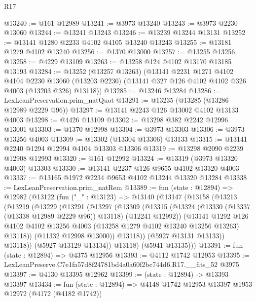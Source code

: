 \begin{lexlean}{R17}
\begin{coremodule}
@13240 := @161 @12989
@13241 := @3973 @13240
@13243 := @3973 @2230 @13060
@13244 := @13241 @13243
@13246 := @13239 @13244 @13131
@13252 := @13141 @1280 @2233 @4102 @4105 @13240 @13243
@13255 := @13181 @1279 @4102 @13240
@13256 := @1370 @13000
@13257 := @13255 @13256
@13258 := @4229 @13109
@13263 := @13258 @124 @4102 @13170 @13185 @13193
@13284 := @13252
    (@13257 @13263)
    (@13141
      @2231
      @1271
      @4102
      @4104
      @2230
      @13060
      (@13203 @2230)
      (@13141 @327 @126 @4102 @4102 @326 @4003 (@13203 @326) @13118))
@13285 := @13246 @13284
@13286 := LexLeanPreservation.prim_natQuot
@13291 := @13235 (@13285 (@13286 @12989 @2229 @96))
@13297 := @13141 @2243 @126 @13002 @4102 @13133 @4003
@13298 := @4426 @13109
@13302 := @13298 @382 @2242 @12996 @13001
@13303 := @1370 @12998
@13304 := @3973 @13303
@13306 := @3973 @13256 @4003
@13309 := @13302 (@13304 @13306) @13133
@13315 := @13141 @2240 @1294 @12994 @4104 @13303 @13306
@13319 := @13298 @2090 @2239 @12908 @12993
@13320 := @161 @12992
@13324 := @13319 (@3973 @13320 @4003) @13303
@13330 := @13141 @2237 @126 @9655 @4102 @13320 @4003
@13337 := @13165 @1972 @2234 @9653 @4102 @13244 @13320 @13284
@13338 := LexLeanPreservation.prim_natRem
@13389 := fun (state : @12894) =>
  @12982
    (@13122
      (fun ("_" : @13123) =>
      @13140
        (@13147
          (@13158
            (@13213
              (@13219
                (@13229
                  (@13291
                    (@13297
                      (@13309
                        (@13315
                          (@13324
                            (@13330 (@13337 (@13338 @12989 @2229 @96)) @13118)
                            (@12241 @12992))
                          (@13141
                            @1292
                            @126
                            @4102
                            @4102
                            @13256
                            @4003
                            (@13258 @1279 @4102 @13240 @13256 @13263)
                            @13118))
                        (@11332 @12998 @13000))
                      @13118))
                  (@5927 @13131 @13133))
                @13118))
            (@5927 @13129 @13134))
          @13118)
        (@5941 @13135)))
@13391 := fun (state : @12894) => @4375 @12956
@13393 := @4112 @1742 @12953
@13395 := LexLeanPreserve.C7e1fa57d8f24781bd4a0a60f2bc744d6.R17.__fits_52 @3975
@13397 := @4130 @13395 @12962
@13399 := (state : @12894) -> @13393 @13397
@13434 := fun (state : @12894) =>
  @4148
    @1742
    @12953
    @13397
    @1953
    @12972
    (@4172 (@4182 @1742))

\end{coremodule}
\end{lexlean}
